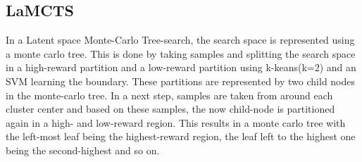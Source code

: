 \documentclass[bibliography=totoc]{scrartcl}
\begin{document}
\subsection{LaMCTS}
In a Latent space Monte-Carlo Tree-search, the search space is represented using a monte carlo tree. This is done by taking samples and splitting the search space in a high-reward partition and a low-reward partition using k-keans(k=2) and an SVM learning the boundary. These partitions are represented by two child nodes in the monte-carlo tree. In a next step, samples are taken from around each cluster center and based on these samples, the now child-node is partitioned again in a high- and low-reward region. This results in a monte carlo tree with the left-most leaf being the highest-reward region, the leaf left to the highest one being the second-highest and so on.
\end{document}
